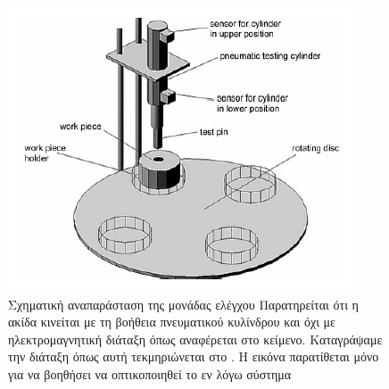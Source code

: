 \documentclass[a4paper,12pt,twoside]{report}
\begin{document}
{				\begin{figure}[hp]
					\centering
					\includegraphics[scale=0.75]{ProcessingStationTestingModuleTrambo.png}
					\caption{Σχηματική αναπαράσταση της μονάδας ελέγχου \cite{ΤοΦυσικόΣύστημαFestoMPS} {\footnotesize Παρατηρείται ότι η ακίδα κινείται με τη βοήθεια πνευματικού κυλίνδρου και όχι με ηλεκτρομαγνητική διάταξη όπως αναφέρεται στο κείμενο. Καταγράψαμε την διάταξη όπως αυτή τεκμηριώνεται στο \cite{FestoMPSProcessingStationManual}. Η εικόνα παρατίθεται μόνο για να βοηθήσει να οπτικοποιηθεί το εν λόγω σύστημα}}
					\label{φωτ:Σχηματική αναπαράσταση της μονάδας ελέγχου από Θράμπο}
				\end{figure}			
				
}
\end{document}
